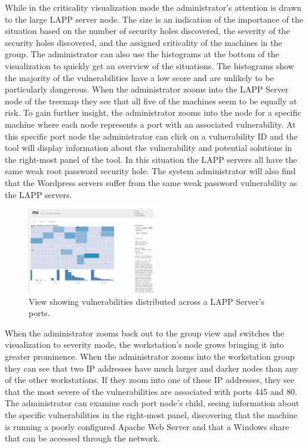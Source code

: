 \documentclass{acm_proc_article-sp}
\begin{document}
While in the criticality visualization mode the administrator's attention is
drawn to the large LAPP server node. The size is an indication of the
importance of the situation based on the number of security holes discovered,
the severity of the security holes discovered, and the assigned criticality of
the machines in the group.
The administrator can also use the histograms at the bottom of the visualization to quickly get an overview of the situations.
The histograms show the majority of the vulnerabilities have a low score and are unlikely to be particularly dangerous.
When the administrator zooms into the LAPP Server
node of the treemap they see that all five of the machines seem to be equally
at risk. To gain further insight, the administrator zooms into the node for a
specific machine where each node represents a port with an associated
vulnerability. At this specific port node the administrator can click on a
vulnerability ID and the tool will display information about the vulnerability
and potential solutions in the right-most panel of the tool. In this situation the LAPP servers all have the same
weak root password security hole. The system administrator will also find that
the Wordpress servers suffer from the same weak password vulnerability as the
LAPP servers.

\begin{figure}
  \label{LAPPServerPortFig}
  \centering
  \includegraphics[width=0.5\textwidth]{../screenshots/final/LappServerSimPort}
  \caption{View showing vulnerabilities distributed across a LAPP Server's ports.}
\end{figure}

When the administrator zooms back out to the
group view and switches the visualization to severity mode, the workstation's
node grows bringing it into greater prominence. When the administrator
zooms into the workstation group they can see that two IP addresses have much
larger and darker nodes than any of the other workstations. If they zoom into
one of these IP addresses, they see that the most severe of the vulnerabilities
are associated with ports 445 and 80. The administrator can examine each port
node's child, seeing information about the specific vulnerabilities in the right-most
panel, discovering that the machine is running a poorly configured Apache
Web Server and that a Windows share that can be accessed through the network.
\end{document}

